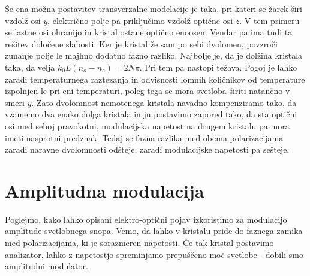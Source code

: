 \begin{remark}
Še ena možna postavitev transverzalne modelacije je taka, pri kateri se 
žarek širi vzdolž osi $y$, električno polje pa priključimo vzdolž optične osi $z$.
V tem primeru se lastne osi ohranijo in kristal ostane optično enoosen. Vendar 
pa ima tudi ta rešitev določene slabosti. Ker je kristal že sam po sebi dvolomen, 
povzroči zunanje polje le majhno dodatno fazno razliko. Najbolje je, da je dolžina 
kristala taka, da velja $k_{0}L(n_{o}-n_{e})=2N\pi$. Pri tem pa nastopi težava. 
Pogoj je lahko zaradi temperaturnega raztezanja in odvisnosti lomnih količnikov od temperature
izpolnjen le pri eni temperaturi, poleg tega se mora svetloba širiti natančno v smeri $y$.
Zato dvolomnost nemotenega kristala navadno kompenziramo tako, da vzamemo
dva enako dolga kristala in ju postavimo zapored tako, da sta optični
osi med seboj pravokotni, modulacijska napetost na drugem kristalu pa mora 
imeti nasprotni predznak. Tedaj se fazna razlika med obema polarizacijama zaradi 
naravne dvolomnosti odšteje, zaradi modulacijske napetosti pa sešteje.
\end{remark}


\section{Amplitudna modulacija}
Poglejmo, kako lahko opisani elektro-optični pojav izkoristimo za modulacijo
amplitude svetlobnega snopa. Vemo, da lahko v kristalu pride do
faznega zamika med polarizacijama, ki je sorazmeren napetosti.
Če tak kristal postavimo analizator, lahko z napetostjo spreminjamo 
prepuščeno moč svetlobe - dobili smo amplitudni modulator.


